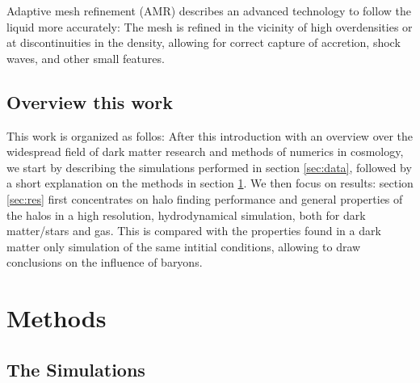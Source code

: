 \documentclass[useAMS,usenatbib]{mn2e}
\begin{document}
Adaptive mesh refinement (AMR) describes an advanced technology to
follow the liquid more accurately: The mesh is refined in the vicinity
of high overdensities or at discontinuities in the density, allowing
for correct capture of accretion, shock waves, and other small
features.

\subsection{Overview this work}

This work is organized as follos: After this introduction with an
overview over the widespread field of dark matter research and methods
of numerics in cosmology, we start by describing the simulations
performed in section \ref{sec:data}, followed by a short explanation
on the methods in section \ref{sec:meth}. We then focus on results:
section \ref{sec:res} first concentrates on halo finding performance
and general properties of the halos in a high resolution,
hydrodynamical simulation, both for dark matter/stars and gas. This is
compared with the properties found in a dark matter only simulation of
the same intitial conditions, allowing to draw conclusions on the
influence of baryons.

%
%
\section{Methods}
\label{sec:meth}

\subsection{The Simulations}
\end{document}
